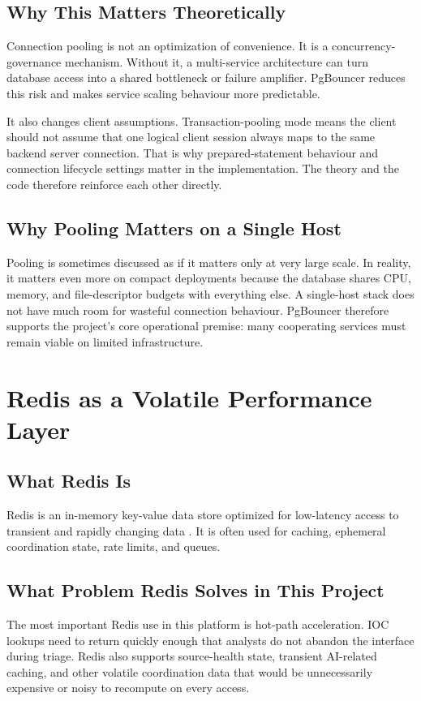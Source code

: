 \subsection{Why This Matters Theoretically}
Connection pooling is not an optimization of convenience. It is a concurrency-governance mechanism. Without it, a multi-service architecture can turn database access into a shared bottleneck or failure amplifier. PgBouncer reduces this risk and makes service scaling behaviour more predictable.

It also changes client assumptions. Transaction-pooling mode means the client should not assume that one logical client session always maps to the same backend server connection. That is why prepared-statement behaviour and connection lifecycle settings matter in the implementation. The theory and the code therefore reinforce each other directly.

\subsection{Why Pooling Matters on a Single Host}
Pooling is sometimes discussed as if it matters only at very large scale. In reality, it matters even more on compact deployments because the database shares CPU, memory, and file-descriptor budgets with everything else. A single-host stack does not have much room for wasteful connection behaviour. PgBouncer therefore supports the project's core operational premise: many cooperating services must remain viable on limited infrastructure.

\section{Redis as a Volatile Performance Layer}
\subsection{What Redis Is}
Redis is an in-memory key-value data store optimized for low-latency access to transient and rapidly changing data \cite{redis_docs}. It is often used for caching, ephemeral coordination state, rate limits, and queues.

\subsection{What Problem Redis Solves in This Project}
The most important Redis use in this platform is hot-path acceleration. IOC lookups need to return quickly enough that analysts do not abandon the interface during triage. Redis also supports source-health state, transient AI-related caching, and other volatile coordination data that would be unnecessarily expensive or noisy to recompute on every access.

